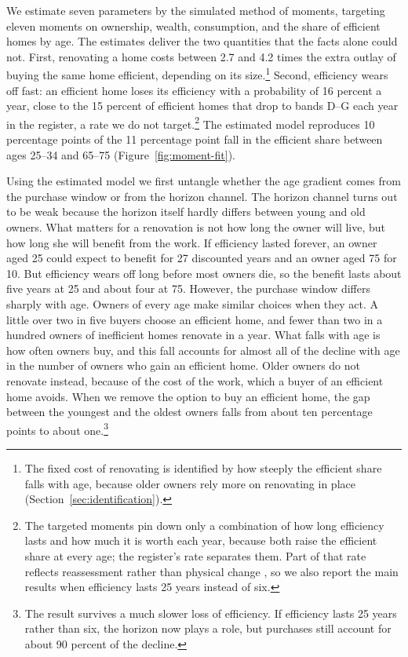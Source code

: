 We estimate seven parameters by the simulated method of moments, targeting
eleven moments on ownership, wealth, consumption, and the share of efficient homes by
age. The estimates deliver the two quantities that the facts alone could
not. First, renovating a home costs between 2.7 and 4.2 times the extra
outlay of buying the same home efficient, depending on its
size.\footnote{The fixed cost of renovating is identified by how steeply
the efficient share falls with age, because older owners rely more on
renovating in place (Section~\ref{sec:identification}).} Second, efficiency
wears off fast: an efficient home loses its efficiency with a probability
of 16 percent a year, close to the 15 percent of efficient homes that drop
to bands D--G each year in the register, a rate we do not
target.\footnote{The targeted moments pin down only a combination of how
long efficiency lasts and how much it is worth each year, because both
raise the efficient share at every age; the register's rate separates
them. Part of that rate reflects reassessment rather than physical change
\citep{crawley2019quantifying}, so we also report the main results when
efficiency lasts 25 years instead of six.} The estimated model reproduces
10 percentage points of the 11 percentage point fall in the efficient share between ages
25--34 and 65--75 (Figure~\ref{fig:moment-fit}).



Using the estimated model we first untangle whether the age gradient comes from the
purchase window or from the horizon channel. The horizon channel turns out to be weak because the horizon itself hardly differs between young and old
owners. What matters for a renovation is not how long the owner will live,
but how long she will benefit from the work. If efficiency lasted forever,
an owner aged 25 could expect to benefit for 27 discounted years and an owner aged 75
for 10. But efficiency wears off long before most owners die, so the
benefit lasts about five years at 25 and about four at 75. However, the purchase window
differs sharply with age. Owners of every age make similar choices when
they act. A little over two in five buyers choose an efficient home, and
fewer than two in a hundred owners of inefficient homes renovate in a
year. What falls with age is how often owners buy, and this fall accounts
for almost all of the decline with age in the number of owners who gain an
efficient home. Older owners do not
renovate instead, because of the cost of the work, which a buyer of
an efficient home avoids. When we remove the option to buy an efficient
home, the gap between the youngest and the oldest owners falls from about
ten percentage points to about one.\footnote{The result survives a much
slower loss of efficiency. If efficiency lasts 25 years rather than six,
the horizon now plays a role, but purchases still account for about 90
percent of the decline.}

